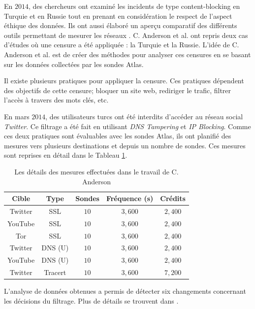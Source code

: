 En $2014$, des chercheurs ont examiné les incidents de type content-blocking en Turquie et en  Russie tout en prenant en considération le respect de l'aspect éthique des données. Ils ont aussi élaboré  un aperçu comparatif des différents outils permettant de mesurer les réseaux \cite{Collin-Anderson}. C. Anderson et al. ont repris deux cas d'études où une censure a été appliquée : la Turquie et la Russie. L'idée de C. Anderson et al. est de créer des méthodes pour analyser ces censures en se basant sur les données collectées par les sondes   Atlas. \par

Il existe plusieurs pratiques pour appliquer la censure. Ces pratiques dépendent des objectifs de cette censure; bloquer un site web, rediriger le trafic, filtrer l'accès à travers des mots clés, etc.

En mars $2014$, des utilisateurs turcs ont été interdits d'accéder au réseau social  \textit{Twitter}.  Ce filtrage a été fait en utilisant \textit{DNS Tampering} et \textit{IP Blocking}. Comme ces deux pratiques sont évaluables avec les sondes  Atlas, ils ont planifié des mesures vers plusieurs destinations et depuis un nombre de  sondes. Ces mesures sont  reprises en détail dans le Tableau  \ref{ta:censorship-colin}.

\begin{table}[H]
	\centering
	\captionsetup{justification=centering}
	\begin{tabular}{ c c c c c}
		\textbf{Cible} &\textbf{Type} &	\textbf{Sondes} &\textbf{Fréquence (s)}	& \textbf{Crédits} \\ \hline
		Twitter &SSL &$ 10 $ &$ 3,600 $ &$ 2,400 $\\ \hline
		YouTube &SSL &$ 10 $ &$ 3,600 $ &$ 2,400 $ \\ \hline
		Tor & SSL &$ 10 $ &$ 3,600 $ &$ 2,400 $ \\ \hline
		Twitter & DNS (U) &$ 10 $ &$ 3,600 $ &$ 2,400 $ \\ \hline
		YouTube & DNS (U) &$ 10 $ &$ 3,600 $ &$ 2,400 $ \\ \hline
		Twitter &Tracert &$ 10 $ &$ 3,600 $ & $ 7,200 $ \\ \hline
	\end{tabular}
	\caption{Les détails des mesures effectuées dans le travail de C. Anderson \cite{Collin-Anderson} }
	\label{ta:censorship-colin}
\end{table}

L'analyse de données obtenues a permis de  détecter  six changements concernant les décisions du filtrage. Plus de détails se trouvent dans \cite{Collin-Anderson}.

